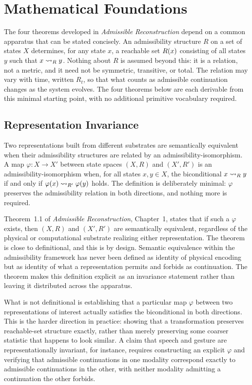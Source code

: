 \chapter{Mathematical Foundations}
\label{ch:essay-math}

The four theorems developed in \emph{Admissible Reconstruction} depend on a common apparatus that can be stated concisely. An admissibility structure $R$ on a set of states $X$ determines, for any state $x$, a reachable set $R(x)$ consisting of all states $y$ such that $x \rightsquigarrow_{R} y$. Nothing about $R$ is assumed beyond this: it is a relation, not a metric, and it need not be symmetric, transitive, or total. The relation may vary with time, written $R_t$, so that what counts as admissible continuation changes as the system evolves. The four theorems below are each derivable from this minimal starting point, with no additional primitive vocabulary required.

\section{Representation Invariance}

Two representations built from different substrates are semantically equivalent when their admissibility structures are related by an admissibility-isomorphism. A map $\varphi : X \to X'$ between state spaces $(X, R)$ and $(X', R')$ is an admissibility-isomorphism when, for all states $x, y \in X$, the biconditional $x \rightsquigarrow_{R} y$ if and only if $\varphi(x) \rightsquigarrow_{R'} \varphi(y)$ holds. The definition is deliberately minimal: $\varphi$ preserves the admissibility relation in both directions, and nothing more is required.

Theorem~1.1 of \emph{Admissible Reconstruction}, Chapter~1, states that if such a $\varphi$ exists, then $(X, R)$ and $(X', R')$ are semantically equivalent, regardless of the physical or computational substrate realizing either representation. The theorem is close to definitional, and this is by design. Semantic equivalence within the admissibility framework has never been defined as identity of physical encoding but as identity of what a representation permits and forbids as continuation. The theorem makes this definition explicit as an invariance statement rather than leaving it distributed across the apparatus.

What is not definitional is establishing that a particular map $\varphi$ between two representations of interest actually satisfies the biconditional in both directions. This is the harder direction in practice: showing that a transformation preserves reachable-set structure exactly, rather than merely preserving some coarser statistic that happens to look similar. A claim that speech and gesture are representationally invariant, for instance, requires constructing an explicit $\varphi$ and verifying that admissible continuations in one modality correspond exactly to admissible continuations in the other, with neither modality admitting a continuation the other forbids.

